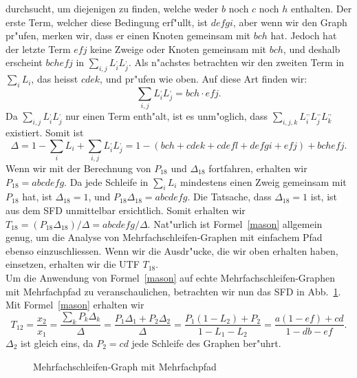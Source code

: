 durchsucht, um diejenigen zu finden, welche weder $b$ noch $c$ noch
$h$ enthalten. Der erste Term, welcher diese Bedingung erf"ullt, ist
$defgi$, aber wenn wir den Graph pr"ufen, merken wir, dass er einen
Knoten gemeinsam mit $bch$ hat.  Jedoch hat der letzte Term $efj$
keine Zweige oder Knoten gemeinsam mit $bch$, und deshalb erscheint
$bchefj$ in $\sum\limits_{i,j}L_i^{\mbox{,}}L_j^{\mbox{,}}$. Als
n"achstes betrachten wir den zweiten Term in $\sum\limits_i L_i$, das
heisst $cdek$, und pr"ufen wie oben.  Auf diese Art finden wir: 
\begin{equation*}
 \sum\limits_{i,j}L_i^{\mbox{,}}L_j^{\mbox{,}}=bch\cdot efj.
\end{equation*}
Da $\sum\limits_{i,j}L_i^{\mbox{,}}L_j^{\mbox{,}}$ nur einen Term
enth"alt, ist es unm"oglich, dass
$\sum\limits_{i,j,k}L_i^{\mbox{,,}}L_j^{\mbox{,,}}L_k^{\mbox{,,}}$
existiert. Somit ist 
\begin{equation*}
 \Delta = 1-\sum\limits_i L_i+\sum\limits_{i,j}L_i^{\mbox{,}}L_j^{\mbox{,}}=1 - (bch+cdek+cdefl+defgi+efj)+bchefj.
\end{equation*}
Wenn wir mit der Berechnung von $P_{18}$ und $\Delta_{18}$ fortfahren,
erhalten wir $P_{18}=abcdefg$. Da jede Schleife in $\sum\limits_i L_i$
mindestens einen Zweig gemeinsam mit $P_{18}$ hat, ist
$\Delta_{18}=1$, und $P_{18}\Delta_{18}=abcdefg$.  Die Tatsache, dass
$\Delta_{18}=1$ ist, ist aus dem SFD unmittelbar ersichtlich. Somit
erhalten wir $T_{18}=(P_{18}\Delta_{18})/\Delta=abcdefg/\Delta.$
Nat"urlich ist Formel~\ref{mason} allgemein genug, um die Analyse von
Mehrfachschleifen-Graphen mit einfachem Pfad ebenso einzuschliessen.
Wenn wir die Ausdr"ucke, die wir oben erhalten haben, einsetzen,
erhalten wir die UTF $T_{18}$.\\

\bsp{}
\nit Um die Anwendung von Formel~\ref{mason} auf echte
Mehrfachschleifen-Graphen mit Mehrfachpfad zu veranschaulichen,
betrachten wir nun das SFD in Abb.~\ref{SFD23}. Mit Formel~\ref{mason}
erhalten wir
\begin{equation*}
 T_{12} = \frac{x_2}{x_1} = \frac{\sum\limits_k P_k\Delta_k}{\Delta} = \frac{P_1\Delta_1+ P_2\Delta_2}{\Delta} = \frac{P_1(1-L_2)+P_2}{1-L_1-L_2} = \frac{a(1-ef)+cd}{1-db-ef}.
\end{equation*} $\Delta_2$ ist gleich eins, da $P_2= cd$ jede Schleife des Graphen
ber"uhrt.\\
\begin{figure}[htb!]
\vspace*{-3mm}\begin{center}
  \caption{Mehrfachschleifen-Graph mit Mehrfachpfad}\label{SFD23}
\end{center}
\vspace*{-9mm}
\end{figure}


